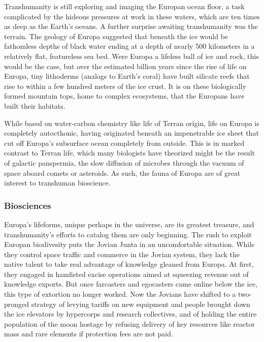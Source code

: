 Transhumanity is still exploring and imaging the 
Europan ocean floor, a task complicated by the hideous pressures at work in these waters, which are ten 
times as deep as the Earth's oceans. A further surprise 
awaiting transhumanity was the terrain. The geology 
of Europa suggested that beneath the ice would be 
fathomless depths of black water ending at a depth of 
nearly 500 kilometers in a relatively flat, featureless 
sea bed. Were Europa a lifeless ball of ice and rock, 
this would be the case, but over the estimated billion 
years since the rise of life on Europa, tiny lithoderms 
(analogs to Earth's coral) have built silicate reefs that 
rise to within a few hundred meters of the ice crust. It 
is on these biologically formed mountain tops, home 
to complex ecosystems, that the Europans have built 
their habitats.

While based on water-carbon chemistry like life 
of Terran origin, life on Europa is completely autocthonic, having originated beneath an impenetrable ice 
sheet that cut off Europa's subsurface ocean completely from outside. This is in marked contrast to Terran 
life, which many biologists have theorized might be 
the result of galactic panspermia, the slow diffusion of 
microbes through the vacuum of space aboard comets 
or asteroids. As such, the fauna of Europa are of great 
interest to transhuman bioscience.

\subsubsection{Biosciences}

Europa's lifeforms, unique perhaps in the universe, 
are its greatest treasure, and transhumanity's efforts 
to catalog them are only beginning. The rush to exploit Europan biodivesity puts the Jovian Junta in an 
uncomfortable situation. While they control space 
traffic and commerce in the Jovian system, they lack 
the native talent to take real advantage of knowledge 
gleaned from Europa. At first, they engaged in hamfisted excise operations aimed at squeezing revenue 
out of knowledge exports. But once farcasters and 
egocasters came online below the ice, this type of 
extortion no longer worked. Now the Jovians have 
shifted to a two-pronged strategy of levying tariffs 
on new equipment and people brought down the ice 
elevators by hypercorps and research collectives, and 
of holding the entire population of the moon hostage 
by refusing delivery of key resources like reactor mass 
and rare elements if protection fees are not paid.


